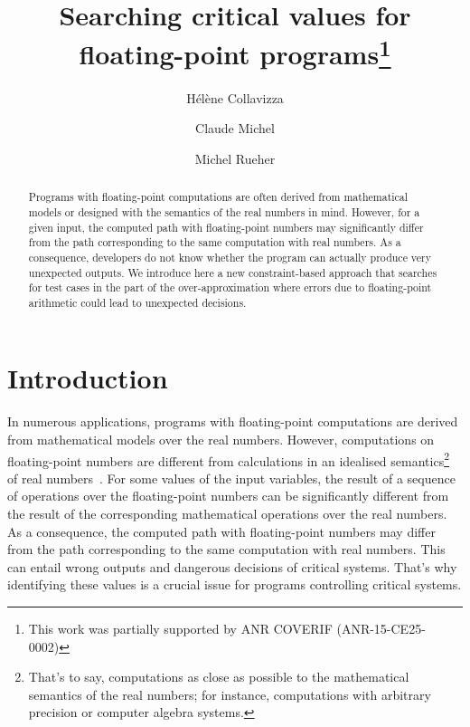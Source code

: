 \documentclass[a4paper]{llncs}
\title{Searching critical values for floating-point programs\thanks{This work was partially supported by
      ANR COVERIF (ANR-15-CE25-0002)
}}
\author{H{\'e}l{\`e}ne Collavizza \and   Claude Michel \and Michel Rueher}
\institute{University of Nice--Sophia Antipolis, I3S/CNRS\\
BP 121, 06903 Sophia Antipolis Cedex, France\\
 \email{firstname.lastname@unice.fr}
}
\begin{document}
\npthousandsep{\,}
\npthousandthpartsep{}



\maketitle

\begin{abstract}

Programs with floating-point computations are often derived from
mathematical models or designed with the semantics of the real numbers
in mind. However, for a given input, the computed path with
floating-point numbers may significantly differ from the path
corresponding to the same computation with real numbers. As a
consequence, developers do not know whether the program can
actually produce very unexpected outputs. We introduce here a new constraint-based
approach that searches for test cases in the part of the
over-approximation where errors due to floating-point arithmetic could
lead to unexpected decisions.  


\end{abstract}

\vspace*{-0.6cm}
\section{Introduction}\label{intro}


\vspace*{-0.2cm}

In numerous applications, programs with floating-point computations are 
derived from mathematical models over the real numbers. However,
computations on floating-point numbers are different from calculations in an
 idealised semantics\footnote{That's to say,  computations as close as possible to the mathematical semantics of the real numbers; for instance,  computations with arbitrary precision or computer algebra systems.} of real numbers~\cite{goldberg91}.
For some values of the input variables, the result of a sequence of
operations over the floating-point numbers can be significantly
different from the result of the corresponding
mathematical operations over the real numbers. 
As a consequence, the computed path with floating-point numbers may
differ from the path corresponding to the same computation with real
numbers. This  can entail wrong outputs and dangerous decisions of  critical systems.  That's why identifying these values is a crucial issue for programs controlling critical systems.
\end{document}
